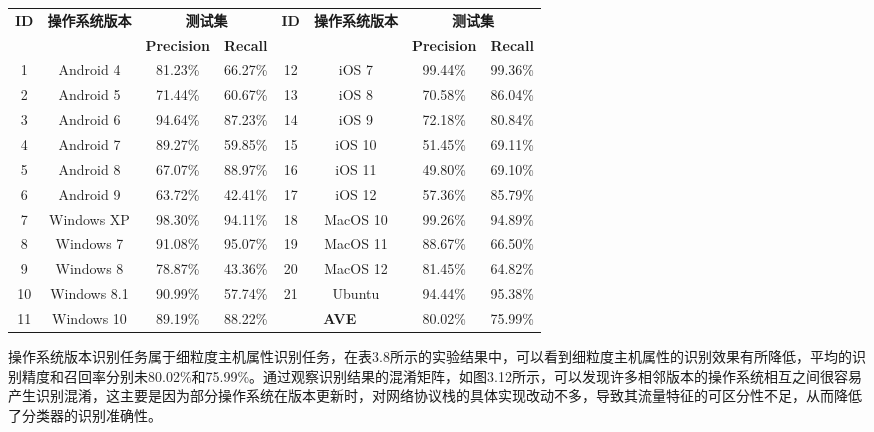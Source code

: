 \begin{table}[!h]
    \centering
    \footnotesize
    \setlength{\tabcolsep}{8pt}
    \renewcommand{\arraystretch}{1}
\begin{tabular}{|c|c|c|c|c|c|c|c|}
\hline
\multirow{2}{*}{\textbf{ID}} & \multirow{2}{*}{\textbf{操作系统版本}} & \multicolumn{2}{c|}{\textbf{测试集}} & \multirow{2}{*}{\textbf{ID}} & \multirow{2}{*}{\textbf{操作系统版本}} & \multicolumn{2}{c|}{\textbf{测试集}} \\ \cline{3-4} \cline{7-8}
 &  & \textbf{Precision} & \textbf{Recall} & & & \textbf{Precision} & \textbf{Recall} \\ \hline
1 & Android 4 & 81.23\% & 66.27\% & 12 & iOS 7 & 99.44\% & 99.36\% \\\hline
2 & Android 5 & 71.44\% & 60.67\% & 13 & iOS 8 & 70.58\% & 86.04\% \\\hline
3 & Android 6 & 94.64\% & 87.23\% & 14 & iOS 9 & 72.18\% & 80.84\% \\\hline
4 & Android 7 & 89.27\% & 59.85\% & 15 & iOS 10 & 51.45\% & 69.11\% \\\hline
5 & Android 8 & 67.07\% & 88.97\% & 16 & iOS 11 & 49.80\% & 69.10\% \\\hline
6 & Android 9 & 63.72\% & 42.41\% & 17 & iOS 12 & 57.36\% & 85.79\% \\\hline
7 & Windows XP & 98.30\% & 94.11\% & 18 & MacOS 10 & 99.26\% & 94.89\% \\\hline
8 & Windows 7 & 91.08\% & 95.07\% & 19 & MacOS 11 & 88.67\% & 66.50\% \\\hline
9 & Windows 8 & 78.87\% & 43.36\% & 20 & MacOS 12 & 81.45\% & 64.82\% \\\hline
10 & Windows 8.1 & 90.99\% & 57.74\% & 21 & Ubuntu & 94.44\% & 95.38\% \\\hline
11 & Windows 10 & 89.19\% & 88.22\% & \multicolumn{2}{c|}{\textbf{AVE}} & 80.02\% & 75.99\% \\\hline
\end{tabular}
\end{table}

操作系统版本识别任务属于细粒度主机属性识别任务，在表3.8所示的实验结果中，可以看到细粒度主机属性的识别效果有所降低，平均的识别精度和召回率分别未80.02\%和75.99\%。通过观察识别结果的混淆矩阵，如图3.12所示，可以发现许多相邻版本的操作系统相互之间很容易产生识别混淆，这主要是因为部分操作系统在版本更新时，对网络协议栈的具体实现改动不多，导致其流量特征的可区分性不足，从而降低了分类器的识别准确性。


